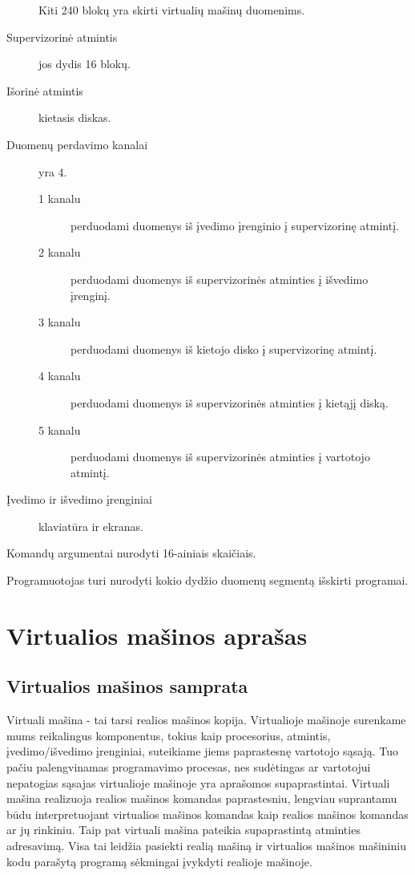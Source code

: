 \begin{description}
    Kiti 240 blokų yra skirti virtualių mašinų duomenims.
  \item[Supervizorinė atmintis] jos dydis 16 blokų.
  \item[Išorinė atmintis] kietasis diskas.
  \item[Duomenų perdavimo kanalai] yra 4. 
    \begin{description}
      \item[1 kanalu] perduodami duomenys iš įvedimo įrenginio į 
        supervizorinę atmintį.
      \item[2 kanalu] perduodami duomenys iš supervizorinės atminties
        į išvedimo įrenginį.
      \item[3 kanalu] perduodami duomenys iš kietojo disko į supervizorinę
        atmintį.
      \item[4 kanalu] perduodami duomenys iš supervizorinės atminties į 
        kietąjį diską.
      \item[5 kanalu] perduodami duomenys iš supervizorinės atminties į 
        vartotojo atmintį.
    \end{description}
  \item[Įvedimo ir išvedimo įrenginiai] klaviatūra ir ekranas.
\end{description}

Komandų argumentai nurodyti 16-ainiais skaičiais.

Programuotojas turi nurodyti kokio dydžio duomenų segmentą 
išskirti programai.

\section{Virtualios mašinos aprašas}

\subsection{Virtualios mašinos samprata}

Virtuali mašina - tai tarsi realios mašinos kopija. Virtualioje mašinoje
surenkame mums reikalingus komponentus, tokius kaip procesorius,
atmintis, įvedimo/išvedimo įrenginiai, suteikiame jiems paprastesnę
vartotojo sąsają. Tuo pačiu palengvinamas programavimo procesas,
nes sudėtingas ar vartotojui nepatogias sąsajas virtualioje mašinoje yra 
aprašomos supaprastintai. Virtuali mašina realizuoja realios mašinos
komandas paprastesniu, lengviau suprantamu būdu interpretuojant virtualios
mašinos komandas kaip realios mašinos komandas ar jų rinkiniu. Taip pat 
virtuali mašina pateikia supaprastintą atminties adresavimą. Visa tai 
leidžia pasiekti realią mašiną ir virtualios mašinos mašininiu kodu 
parašytą programą sėkmingai įvykdyti realioje mašinoje. 
